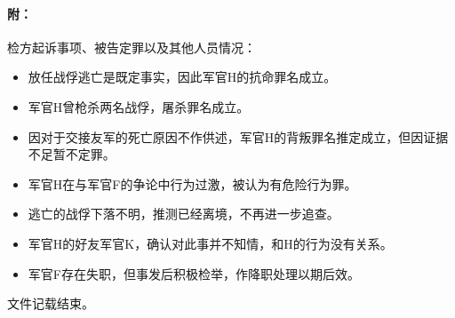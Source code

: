 \lineseparator
\paragraph*{附：}

检方起诉事项、被告定罪以及其他人员情况：
\begin{itemize}
    \item 放任战俘逃亡是既定事实，因此军官H的抗命罪名成立。
    \item 军官H曾枪杀两名战俘，屠杀罪名成立。
    \item 因对于交接友军的死亡原因不作供述，军官H的背叛罪名推定成立，但因证据不足暂不定罪。
    \item 军官H在与军官F的争论中行为过激，被认为有危险行为罪。
    \item 逃亡的战俘下落不明，推测已经离境，不再进一步追查。
    \item 军官H的好友军官K，确认对此事并不知情，和H的行为没有关系。
    \item 军官F存在失职，但事发后积极检举，作降职处理以期后效。
\end{itemize}

\lineseparator
文件记载结束。